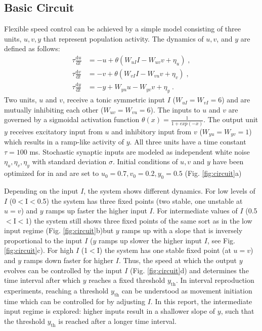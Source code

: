 \documentclass[10pt]{article}
\begin{document}
\subsection{Basic Circuit}
Flexible speed control can be achieved by a simple model consisting of three units, $u, v, y$ that represent population activity. 
The dynamics of $u, v$, and $y$ are defined as follows:
\begin{equation} \label{circuit}
	\begin{split}
	\tau\frac{\text{d}u}{\text{d}t} & = -u + \theta(W_{uI}I - W_{uv}v + \eta_u) \;, \\
	\tau\frac{\text{d}v}{\text{d}t} & = -v + \theta(W_{vI}I - W_{vu}v + \eta_v) \;, \\
	\tau\frac{\text{d}y}{\text{d}t} & = -y + W_{yu}u - W_{yv}v + \eta_y \;.
	\end{split}
\end{equation}
Two units, $u$ and $v$, receive a tonic symmetric input $I$ ($W_{uI}=W_{vI}=6$) and are mutually inhibiting each other ($W_{uv}=W_{vu}=6$). 
The inputs to $u$ and $v$ are governed by a sigmoidal activation function $\theta(x) = \frac{1}{1+exp(-x)}$.
The output unit $y$ receives excitatory input from $u$ and inhibitory input from $v$ ($W_{yu}=W_{yv}=1$) which results in a ramp-like activity of $y$.
All three units have a time constant $\tau = 100$ ms. 
Stochastic synaptic inputs are modeled as independent white noise $\eta_u, \eta_v, \eta_y$ with standard deviation $\sigma$.
Initial conditions of $u, v$ and $y$ have been optimized for in \cite{Egger2020} and are set to $u_0=0.7 , v_0=0.2 , y_0=0.5$ (Fig. \ref{fig:circuit}a)

Depending on the input $I$, the system shows different dynamics. For low levels of $I$ (0$<$I$<$0.5) the system has three fixed points (two stable, one unstable at $u=v$) and $y$ ramps up faster the higher input $I$. 
For intermediate values of $I$ (0.5$<$I$<$1) the system still shows three fixed points of the same sort as in the low input regime (Fig. \ref{fig:circuit}b)but $y$ ramps up with a slope that is inversely proportional to the input $I$ ($y$ ramps up slower the higher input $I$, see Fig. \ref{fig:circuit}c). 
For high $I$ (1$<$I) the system has one stable fixed point (at $u=v$) and $y$ ramps down faster for higher $I$.
Thus, the speed at which the output $y$ evolves can be controlled by the input $I$ (Fig. \ref{fig:circuit}d) and determines the time interval after which $y$ reaches a fixed threshold $y_{\text{th}}$. 
In interval reproduction experiments, reaching a threshold $y_{\text{th}}$ can be understood as movement initiation time which can be controlled for by adjusting $I$.
In this report, the intermediate input regime is explored: higher inputs result in a shallower slope of $y$, such that the threshold $y_{\text{th}}$ is reached after a longer time interval.
\end{document}
